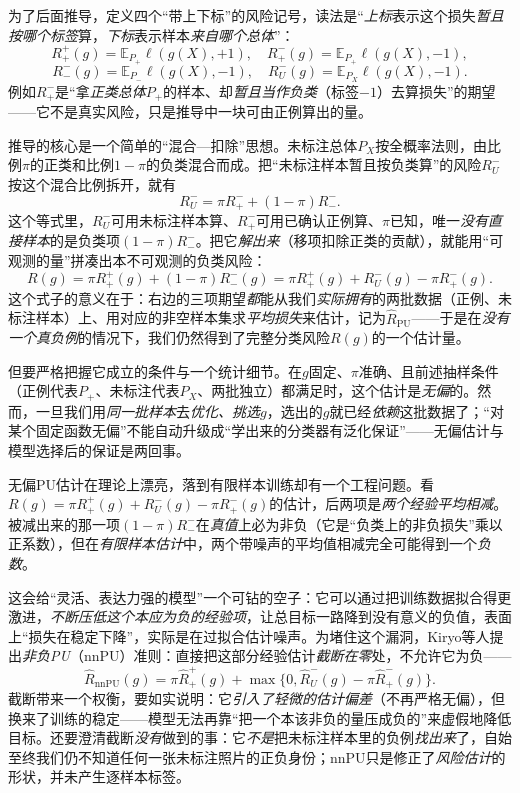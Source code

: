 为了后面推导，定义四个“带上下标”的风险记号，读法是“\emph{上标}表示这个损失\emph{暂且按哪个标签}算，\emph{下标}表示样本\emph{来自哪个总体}”：
\[
  R_+^+(g)=\mathbb E_{P_+}\ell(g(X),+1),\quad
  R_+^-(g)=\mathbb E_{P_+}\ell(g(X),-1),
\]
\[
  R_-^-(g)=\mathbb E_{P_-}\ell(g(X),-1),\quad
  R_U^-(g)=\mathbb E_{P_X}\ell(g(X),-1).
\]
例如$R_+^-$是“拿\emph{正类总体}$P_+$的样本、却\emph{暂且当作负类}（标签$-1$）去算损失”的期望——它不是真实风险，只是推导中一块可由正例算出的量。

推导的核心是一个简单的“混合—扣除”思想。未标注总体$P_X$按全概率法则，由比例$\pi$的正类和比例$1-\pi$的负类混合而成。把“未标注样本暂且按负类算”的风险$R_U^-$按这个混合比例拆开，就有
\[
  R_U^-=\pi R_+^-+(1-\pi)R_-^-.
\]
这个等式里，$R_U^-$可用未标注样本算、$R_+^-$可用已确认正例算、$\pi$已知，唯一\emph{没有直接样本}的是负类项$(1-\pi)R_-^-$。把它\emph{解出来}（移项扣除正类的贡献），就能用“可观测的量”拼凑出本不可观测的负类风险：
\begin{equation}
  R(g)=\pi R_+^+(g)+(1-\pi)R_-^-(g)
      =\pi R_+^+(g)+R_U^-(g)-\pi R_+^-(g).
  \label{eq:ka-pu-risk}
\end{equation}
这个式子的意义在于：右边的三项期望\emph{都}能从我们\emph{实际拥有}的两批数据（正例、未标注样本）上、用对应的非空样本集求\emph{平均损失}来估计，记为$\widehat R_{\mathrm{PU}}$——于是在\emph{没有一个真负例}的情况下，我们仍然得到了完整分类风险$R(g)$的一个估计量。

但要严格把握它成立的条件与一个统计细节。在$g$固定、$\pi$准确、且前述抽样条件（正例代表$P_+$、未标注代表$P_X$、两批独立）都满足时，这个估计是\emph{无偏}的。然而，一旦我们用\emph{同一批样本}去\emph{优化、挑选}$g$，选出的$g$就已经\emph{依赖}这批数据了；“对某个固定函数无偏”不能自动升级成“学出来的分类器有泛化保证”——无偏估计与模型选择后的保证是两回事。

无偏PU估计在理论上漂亮，落到有限样本训练却有一个工程问题。看$R(g)=\pi R_+^+(g)+R_U^-(g)-\pi R_+^-(g)$的估计，后两项是\emph{两个经验平均相减}。被减出来的那一项$(1-\pi)R_-^-$在\emph{真值}上必为非负（它是“负类上的非负损失”乘以正系数），但在\emph{有限样本估计}中，两个带噪声的平均值相减完全可能得到一个\emph{负数}。

这会给“灵活、表达力强的模型”一个可钻的空子：它可以通过把训练数据拟合得更激进，\emph{不断压低这个本应为负的经验项}，让总目标一路降到没有意义的负值，表面上“损失在稳定下降”，实际是在过拟合估计噪声。为堵住这个漏洞，Kiryo等人提出\emph{非负PU}（nnPU）准则：直接把这部分经验估计\emph{截断在零}处，不允许它为负——
\begin{equation}
  \widehat R_{\mathrm{nnPU}}(g)
  =\pi\widehat R_+^+(g)
   +\max\{0,\widehat R_U^-(g)-\pi\widehat R_+^-(g)\}.
  \label{eq:ka-nnpu-risk}
\end{equation}
截断带来一个权衡，要如实说明：它\emph{引入了轻微的估计偏差}（不再严格无偏），但换来了训练的稳定——模型无法再靠“把一个本该非负的量压成负的”来虚假地降低目标。还要澄清截断\emph{没有}做到的事：它\emph{不是}把未标注样本里的负例\emph{找出来}了，自始至终我们仍不知道任何一张未标注照片的正负身份；nnPU只是修正了\emph{风险估计}的形状，并未产生逐样本标签。

